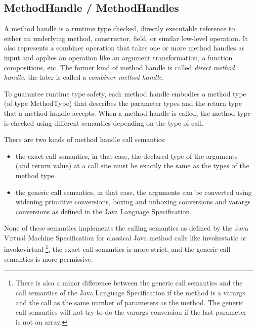 \documentclass{sig-alternate}
\begin{document}
    \subsection{MethodHandle / MethodHandles}
      \label{MH}

      A method handle is a runtime type checked, directly executable reference to
      either an underlying method, constructor, field, or similar low-level operation.
      It also represents a combiner operation that takes one or more method handles as input and
      applies an operation like an argument transformation, a function compositions, etc.
      The former kind of method handle is called {\it direct method handle},
      the later is called a {\it combiner method handle}.

      To guarantee runtime type safety, each method handle embodies a method type (of type MethodType)
      that describes the parameter types and the return type that a method handle accepts.
      When a method handle is called, the method type is checked using different semantics depending on the
      type of call.

      There are two kinds of method handle call semantics:
      \begin{itemize}
        \item the exact call semantics, in that case, the declared type of the arguments (and return value) at a call site
              must be exactly the same as the types of the method type.
        \item the generic call semantics, in that case, the arguments can be converted using widening primitive conversions,
              boxing and unboxing conversions and varargs conversions as defined in the Java Language Specification.
      \end{itemize}
      None of these semantics implements the calling semantics as defined by the Java Virtual Machine Specification
      for classical Java method calls like invokestatic or invokevirtual
      \footnote{There is also a minor difference between the generic call semantics and the call semantics of
        the Java Language Specification if the method is a varargs and the call as the same number of parameters as the method.
        The generic call semantics will not try to do the varargs conversion if the last parameter is not an array.},
      the exact call semantics is more strict, and the generic call semantics is more permissive.

\end{document}
